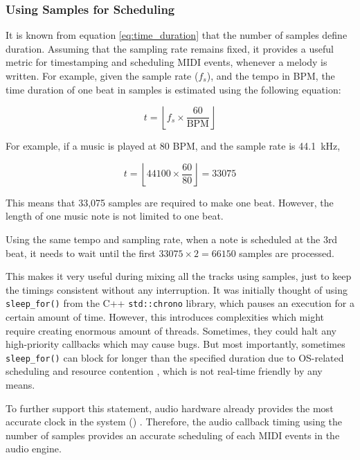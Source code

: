 \subsubsection{Using Samples for Scheduling}
\label{sec:sample_scheduling}

It is known from equation \eqref{eq:time_duration} that the number of samples 
define duration. Assuming that the sampling rate remains fixed, it provides a useful 
metric for timestamping and scheduling MIDI events, whenever a melody is written. 
For example, given the sample rate ($f_s$), and the tempo in BPM, the time duration 
of one beat in samples is estimated using the following equation:

\begin{equation}
    t = \left\lfloor f_s \times  \frac{60}{\text{BPM}} \right\rfloor
\end{equation}

For example, if a music is played at 80 BPM, and the sample rate is \SI{44.1}{\kilo \hertz},

$$
    t = \left\lfloor 44100 \times \frac{60}{80} \right\rfloor = 33075
$$

This means that 33,075 samples are required to make one beat. However, the length of one 
music note is not limited to one beat.

Using the same tempo and sampling rate, when a note is scheduled at the 3rd beat, it needs to wait until
the first $33075 \times 2 = 66150$ samples are processed.

This makes it very useful during mixing all the tracks using samples, just to keep the timings
consistent without any interruption. It was initially thought of using \texttt{sleep\_for()} from
the C++ \texttt{std::chrono} library, which pauses an execution for a certain amount of time.
However, this introduces complexities which might require creating enormous amount of threads. Sometimes, they could halt
any high-priority callbacks which may cause bugs. But most importantly, sometimes \texttt{sleep\_for()}
can block for longer than the specified duration due to OS-related scheduling and resource contention 
\cite{cppreference_sleep_for}, which is not real-time friendly by any means. 

To further support this statement, audio hardware already provides the most accurate clock
in the system () \cite{openai_chatgpt}. Therefore, the audio callback 
timing using the number of samples provides an accurate scheduling of each MIDI events in the 
audio engine.